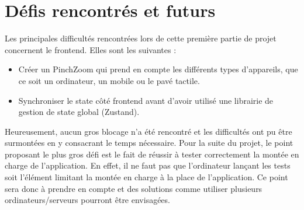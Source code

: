 \section{Défis rencontrés et futurs}

Les principales difficultés rencontrées lors de cette première partie de projet concernent le frontend. Elles sont les suivantes :

\begin{itemize}
  \item Créer un PinchZoom qui prend en compte les différents types d'appareils, que ce soit un ordinateur, un mobile ou le pavé tactile.
  \item Synchroniser le state côté frontend avant d'avoir utilisé une librairie de gestion de state global (Zustand).
\end{itemize}

Heureusement, aucun gros blocage n'a été rencontré et les difficultés ont pu être surmontées en y consacrant le temps nécessaire. Pour la suite du projet, le point proposant le plus gros défi est le fait de réussir à tester correctement la montée en charge de l'application. En effet, il ne faut pas que l'ordinateur lançant les tests soit l'élément limitant la montée en charge à la place de l'application. Ce point sera donc à prendre en compte et des solutions comme utiliser plusieurs ordinateurs/serveurs pourront être envisagées.

\vfil
\hspace{8cm}\makeatletter\@author\makeatother\par
\hspace{8cm}\begin{minipage}{5cm}
  \printsignature
\end{minipage}
